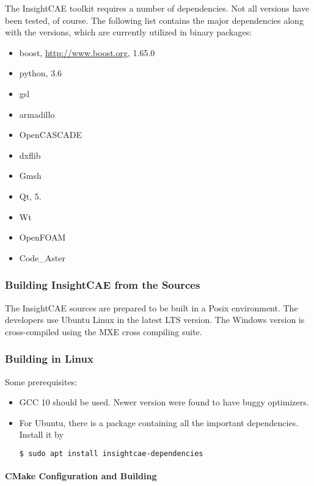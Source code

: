 The InsightCAE toolkit requires a number of dependencies. 
Not all versions have been tested, of course. 
The following list contains the major dependencies along with the versions, which are currently utilized in binary packages:
\begin{itemize}
\item boost, \url{http://www.boost.org}, 1.65.0
\item python, 3.6
\item gsl
\item armadillo
\item OpenCASCADE
\item dxflib
\item Gmsh
\item Qt, 5.
\item Wt
\item OpenFOAM
\item Code\_Aster
\end{itemize}

\subsubsection{Building InsightCAE from the Sources}

The InsightCAE sources are prepared to be built in a Posix environment.
The developers use Ubuntu Linux in the latest LTS version.
The Windows version is cross-compiled using the MXE cross compiling suite.

\subsubsection{Building in Linux}

Some prerequisites:
\begin{itemize}
\item GCC 10 should be used. Newer version were found to have buggy optimizers. \warningsymbol
\item For Ubuntu, there is a package containing all the important dependencies. 
Install it by
\begin{lstlisting}[language=bash]
$ sudo apt install insightcae-dependencies
\end{lstlisting}
\end{itemize}

\paragraph{CMake Configuration and Building}

